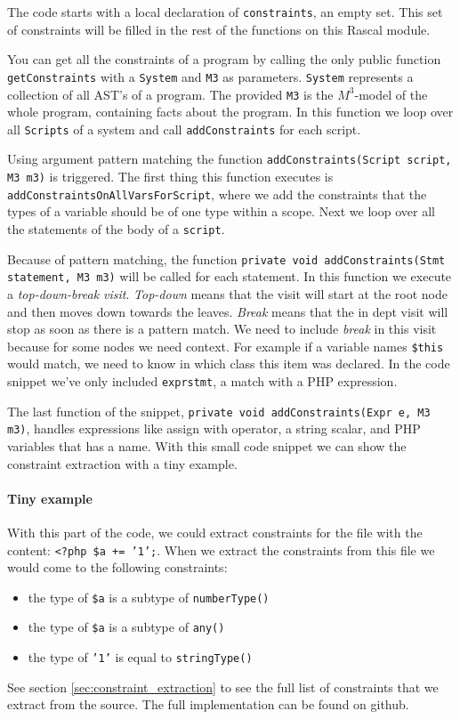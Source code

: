 \documentclass[../main.tex]{subfiles}
\begin{document}
	The code starts with a local declaration of \texttt{constraints}, an empty set.
	This set of constraints will be filled in the rest of the functions on this Rascal module.
	
	You can get all the constraints of a program by calling the only public function \texttt{getConstraints} with a \texttt{System} and \texttt{M3} as parameters.
	\texttt{System} represents a collection of all AST's of a program.
	The provided \texttt{M3} is the $M^3$-model of the whole program, containing facts about the program.
	In this function we loop over all \texttt{Scripts} of a system and call \texttt{addConstraints} for each script.
	
	Using argument pattern matching the function \texttt{addConstraints(Script script, M3 m3)} is triggered.
	The first thing this function executes is \texttt{addConstraintsOnAllVarsForScript}, where we add the constraints that the types of a variable should be of one type within a scope.
	Next we loop over all the statements of the body of a \texttt{script}.
	
	Because of pattern matching, the function \texttt{private void addConstraints(Stmt statement, M3 m3)} will be called for each statement.
	In this function we execute a \textit{top-down-break visit}. \textit{Top-down} means that the visit will start at the root node and then moves down towards the leaves.
	\textit{Break} means that the in dept visit will stop as soon as there is a pattern match.
	We need to include \textit{break} in this visit because for some nodes we need context.
	For example if a variable names \texttt{\$this} would match, we need to know in which class this item was declared.
	In the code snippet we've only included \texttt{exprstmt}, a match with a PHP expression.
	
	The last function of the snippet, \texttt{private void addConstraints(Expr e, M3 m3)}, handles expressions like assign with operator, a string scalar, and PHP variables that has a name.
	With this small code snippet we can show the constraint extraction with a tiny example.
	
	\paragraph{Tiny example}
	With this part of the code, we could extract constraints for the file with the content: \texttt{<?php \$a += '1';}.
	When we extract the constraints from this file we would come to the following constraints:
	\begin{itemize}
		\item the type of \texttt{\$a} is a subtype of \texttt{numberType()}
		\item the type of \texttt{\$a} is a subtype of \texttt{any()}
		\item the type of \texttt{'1'} is equal to \texttt{stringType()}
	\end{itemize}
	See section \ref{sec:constraint_extraction} to see the full list of constraints that we extract from the source.
	The full implementation can be found on github.
	
\end{document}

